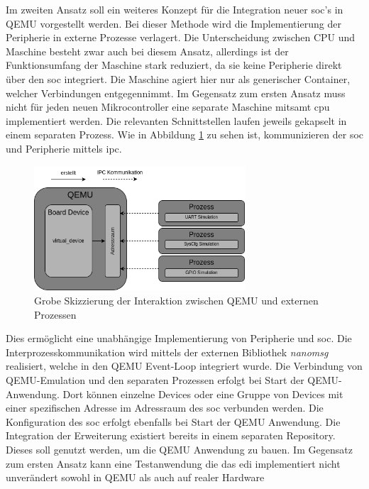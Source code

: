 Im zweiten Ansatz soll ein weiteres Konzept für die Integration neuer
\ac{soc}'s in QEMU vorgestellt werden.
Bei dieser Methode wird die Implementierung der Peripherie in externe Prozesse
verlagert.
Die Unterscheidung zwischen CPU und Maschine besteht zwar auch bei diesem
Ansatz, allerdings ist der Funktionsumfang der Maschine stark reduziert, da sie
keine Peripherie direkt über den \ac{soc} integriert.
Die Maschine agiert hier nur als generischer Container, welcher Verbindungen
entgegennimmt.
Im Gegensatz zum ersten Ansatz muss nicht für jeden neuen Mikrocontroller eine
separate Maschine mitsamt \ac{cpu} implementiert werden.
Die relevanten Schnittstellen laufen jeweils gekapselt in einem separaten
Prozess.
Wie in Abbildung \ref{fig:QemuExternalDeviceErweiterung} zu sehen ist,
kommunizieren der \ac{soc} und Peripherie mittels \ac{ipc}.
\begin{figure}[!htb]
    \centering
    \includegraphics[width=0.7\textwidth]{anlagen/bilder/Qemu_external_device}
    \caption{Grobe Skizzierung der Interaktion zwischen QEMU und externen Prozessen}
    \label{fig:QemuExternalDeviceErweiterung}
\end{figure}
Dies ermöglicht eine unabhängige Implementierung von Peripherie und \ac{soc}.
Die Interprozesskommunikation wird mittels der externen Bibliothek
\textit{nanomsg} realisiert, welche in den QEMU Event-Loop integriert
wurde\cite{NanoMsg}.
Die Verbindung von QEMU-Emulation und den separaten Prozessen erfolgt bei Start
der QEMU-Anwendung.
Dort können einzelne Devices oder eine Gruppe von Devices mit einer
spezifischen Adresse im Adressraum des \ac{soc} verbunden werden.
Die Konfiguration des \ac{soc} erfolgt ebenfalls bei Start der QEMU Anwendung.
Die Integration der Erweiterung existiert bereits in einem separaten
Repository\cite{QemuEdiRepo}.
Dieses soll genutzt werden, um die QEMU Anwendung zu bauen.
\newline
Im Gegensatz zum ersten Ansatz kann eine Testanwendung die das \ac{edi}
implementiert nicht unverändert sowohl in QEMU als auch auf realer Hardware
